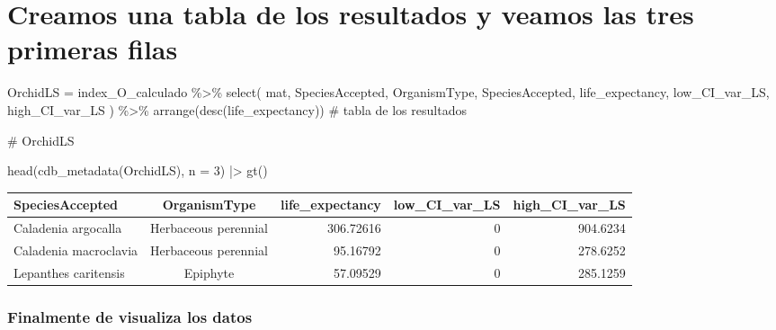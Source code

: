 \documentclass[
  12pt,
  letterpaper,
]{book}
\newenvironment{Shaded}{\begin{snugshade}}{\end{snugshade}}
\newcommand{\AttributeTok}[1]{\textcolor[rgb]{0.40,0.45,0.13}{#1}}
\newcommand{\CommentTok}[1]{\textcolor[rgb]{0.37,0.37,0.37}{#1}}
\newcommand{\DecValTok}[1]{\textcolor[rgb]{0.68,0.00,0.00}{#1}}
\newcommand{\FunctionTok}[1]{\textcolor[rgb]{0.28,0.35,0.67}{#1}}
\newcommand{\NormalTok}[1]{\textcolor[rgb]{0.00,0.23,0.31}{#1}}
\newcommand{\OtherTok}[1]{\textcolor[rgb]{0.00,0.23,0.31}{#1}}
\newcommand{\SpecialCharTok}[1]{\textcolor[rgb]{0.37,0.37,0.37}{#1}}
\begin{document}
\section{Creamos una tabla de los resultados y veamos las tres primeras
filas}\label{creamos-una-tabla-de-los-resultados-y-veamos-las-tres-primeras-filas}

\begin{Shaded}
\begin{Highlighting}[]
\NormalTok{OrchidLS }\OtherTok{=}\NormalTok{ index\_O\_calculado }\SpecialCharTok{\%\textgreater{}\%}
  \FunctionTok{select}\NormalTok{(}
\NormalTok{    mat,}
\NormalTok{    SpeciesAccepted,}
\NormalTok{    OrganismType,}
\NormalTok{    SpeciesAccepted,}
\NormalTok{    life\_expectancy,}
\NormalTok{    low\_CI\_var\_LS,}
\NormalTok{    high\_CI\_var\_LS}
\NormalTok{  ) }\SpecialCharTok{\%\textgreater{}\%}
  \FunctionTok{arrange}\NormalTok{(}\FunctionTok{desc}\NormalTok{(life\_expectancy)) }\CommentTok{\# tabla de los resultados}

\CommentTok{\# OrchidLS}

\FunctionTok{head}\NormalTok{(}\FunctionTok{cdb\_metadata}\NormalTok{(OrchidLS), }\AttributeTok{n =} \DecValTok{3}\NormalTok{) }\SpecialCharTok{|\textgreater{}} 
  \FunctionTok{gt}\NormalTok{()}
\end{Highlighting}
\end{Shaded}

\begin{table}
\fontsize{12.0pt}{14.0pt}\selectfont
\begin{tabular*}{\linewidth}{@{\extracolsep{\fill}}lcrrr}
\toprule
SpeciesAccepted & OrganismType & life\_expectancy & low\_CI\_var\_LS & high\_CI\_var\_LS \\ 
\midrule\addlinespace[2.5pt]
Caladenia argocalla & Herbaceous perennial & 306.72616 & 0 & 904.6234 \\ 
Caladenia macroclavia & Herbaceous perennial & 95.16792 & 0 & 278.6252 \\ 
Lepanthes caritensis & Epiphyte & 57.09529 & 0 & 285.1259 \\ 
\bottomrule
\end{tabular*}
\end{table}

\subsubsection{Finalmente de visualiza los
datos}\label{finalmente-de-visualiza-los-datos}
\end{document}
